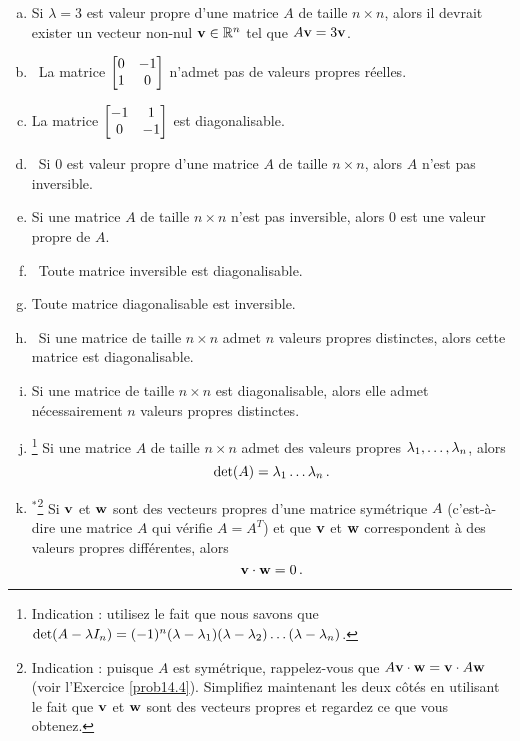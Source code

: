 \begin{prob}
\begin{enumerate}[a)]
\item Si $\lambda=3$ est valeur propre d'une matrice $A$ de taille $n \times n$, alors il devrait exister un vecteur non-nul $\mathbf{v} \in \mathbb{R}^n$ tel que $A\mathbf{v}=3\mathbf{v}$.
\medskip
 
\item\sov~La matrice $\bmatrix 0&-1\\1&0\endbmatrix$ n'admet pas de valeurs propres r\'eelles.
\medskip
 
\item La matrice $\bmatrix -1&1\\0&-1\endbmatrix$ est
diagonalisable.
\medskip
 
\item\sov~Si $0$ est valeur propre d'une matrice $A$ de taille $n \times n$, alors $A$ n'est pas inversible.
\medskip
 
\item Si une matrice $A$ de taille $n \times n$ n'est
pas inversible, alors $0$ est une valeur propre de $A$.
\medskip
 
\item\sov~Toute matrice inversible est diagonalisable.
\medskip
 
\item Toute matrice diagonalisable est inversible.
\medskip
 
\item\sov~Si une matrice de taille $n \times n$ admet $n$ valeurs propres distinctes, alors cette matrice est diagonalisable. 
\medskip
 
\item Si une matrice de taille $n \times n$ est diagonalisable, alors elle admet nécessairement $n$ valeurs propres distinctes. 
\medskip
 
\item\sov\footnote{ Indication : utilisez le fait que nous savons que $\det(A-\lambda I_n)=(-1)^n(\lambda-\lambda_1)(\lambda-\lambda_2)\dots(\lambda-\lambda_n) $.} Si une matrice  $A$ de taille $n \times n$ admet des valeurs propres $\lambda_1, \dots ,\lambda_n$, alors $$\det (A)=\lambda_1 \dots\lambda_n\,.$$
 
\item$^{\ast}$\footnote{ Indication : puisque $A$ est symétrique, rappelez-vous que $A\mathbf{v}\cdot \mathbf{w}=\mathbf{v}\cdot A\mathbf{w}$ (voir l'Exercice \ref{prob14.4}). Simplifiez maintenant les deux côtés en utilisant le fait que $\mathbf{v}$ et $\mathbf{w}$ sont des vecteurs propres et regardez ce que vous obtenez.} Si $\mathbf{v}$ et $\mathbf{w}$ sont des vecteurs propres d'une matrice symétrique $A$ (c'est-à-dire une matrice $A$ qui vérifie $A=A^T$) et que $\mathbf{v}$ et $\mathbf{w}$ correspondent à des valeurs propres différentes, alors $$\mathbf{v} \cdot \mathbf{w}=0\,.$$  
\medskip
\end{enumerate}
\end{prob} 
